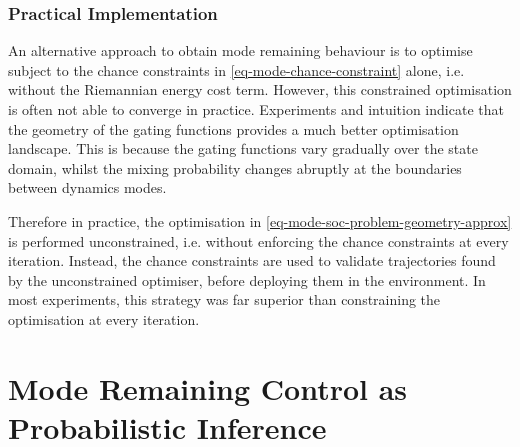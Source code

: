 \documentclass{mimosis-class/mimosis}
\numberwithin{equation}{chapter}
\newcommand{\modeInd}{\ensuremath{k}}
\newcommand{\state}{\ensuremath{\mathbf{x}}}
\newcommand{\control}{\ensuremath{\mathbf{u}}}
\newcommand{\modeVar}{\ensuremath{\alpha}}
\begin{document}
{\subsubsection{Practical Implementation}
\label{sec:org8b08376}
An alternative approach to obtain mode remaining behaviour is to optimise subject to the chance constraints
in \cref{eq-mode-chance-constraint} alone, i.e. without the Riemannian energy cost term.
However, this constrained optimisation is often not able to converge in practice.
Experiments and intuition indicate that the geometry of the gating functions provides a much
better optimisation landscape.
This is because the gating functions vary gradually over the state domain, whilst the mixing probability changes
abruptly at the boundaries between dynamics modes.

Therefore in practice, the optimisation in \cref{eq-mode-soc-problem-geometry-approx}
is performed unconstrained, i.e. without enforcing the chance constraints at every iteration.
Instead, the chance constraints are used to validate trajectories found by the unconstrained
optimiser, before deploying them in the environment.
In most experiments, this strategy was far superior than constraining the optimisation at every iteration.

\section{Mode Remaining Control as Probabilistic Inference \label{chap-traj-opt-inference}}
\label{sec:orge157493}
\newcommand{\startStateDist}{\ensuremath{p(\state_{1})}}
\newcommand{\transitionDist}{\ensuremath{p(\state_{\timeInd+1} \mid \state_\timeInd, \control_\timeInd, \modeVar_{\timeInd}=\desiredMode)}}
\renewcommand{\controlDist}{\ensuremath{\policy(\control_\timeInd \mid \state_\timeInd)}}


\renewcommand{\trajectoryVarDist}{\ensuremath{q(\stateTraj, \controlTraj \mid \state_0, \modeVarTraj)}}
\newcommand{\controlTrajVarDist}{\ensuremath{q(\control_{0:\TimeInd} \mid \state_{0:\TimeInd})}}
\newcommand{\controlVarDist}{\ensuremath{q(\control_{\timeInd})}}

\newcommand{\optimalVar}{\ensuremath{\mathcal{O}}}
\newcommand{\monotonicFunc}{\ensuremath{g}}
\newcommand{\temperature}{\ensuremath{\gamma}}

\newcommand{\optimalVarTraj}{\ensuremath{\bar{\bm{\optimalVar}}}}

\newcommand{\modeProb}{\ensuremath{\Pr(\modeVar_\timeInd = \modeInd \mid \state_\timeInd, \control_\timeInd)}}
\renewcommand{\optimalProb}{\ensuremath{\Pr(\optimalVar_\timeInd = 1 \mid \state_\timeInd, \control_\timeInd)}}
\newcommand{\optimalDist}{\ensuremath{P(\optimalVar_\timeInd \mid \state_\timeInd, \control_\timeInd)}}

}
\end{document}
